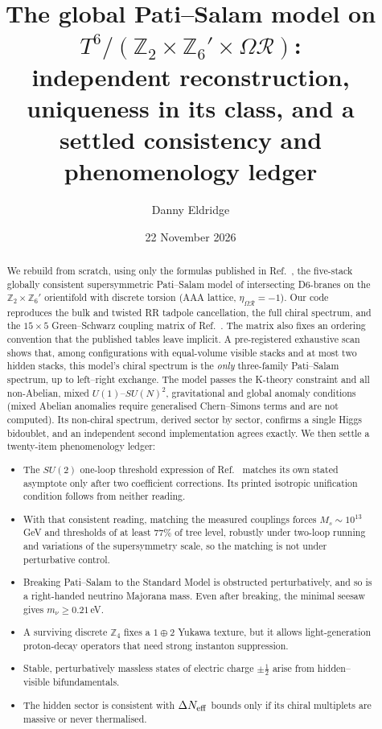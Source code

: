 \documentclass[aps,prd,twocolumn,superscriptaddress,nofootinbib,showkeys]{revtex4-2}
\begin{document}
\title{The global Pati--Salam model on $T^6/(\mathbb{Z}_2\times\mathbb{Z}_6'\times\Omega\mathcal{R})$:\\ independent reconstruction, uniqueness in its class, and a settled consistency and phenomenology ledger}
\author{Danny Eldridge}
\date{22 November 2026}
\begin{abstract}
We rebuild from scratch, using only the formulas published in Ref.~\cite{HRS}, the five-stack globally consistent supersymmetric Pati--Salam model of intersecting D6-branes on the $\mathbb{Z}_2\times\mathbb{Z}_6'$ orientifold with discrete torsion (AAA lattice, $\eta_{\Omega\mathcal R}=-1$). Our code reproduces the bulk and twisted RR tadpole cancellation, the full chiral spectrum, and the $15\times5$ Green--Schwarz coupling matrix of Ref.~\cite{HRS}. The matrix also fixes an ordering convention that the published tables leave implicit. A pre-registered exhaustive scan shows that, among configurations with equal-volume visible stacks and at most two hidden stacks, this model's chiral spectrum is the \emph{only} three-family Pati--Salam spectrum, up to left--right exchange. The model passes the K-theory constraint and all non-Abelian, mixed $U(1)$--$SU(N)^2$, gravitational and global anomaly conditions (mixed Abelian anomalies require generalised Chern--Simons terms and are not computed). Its non-chiral spectrum, derived sector by sector, confirms a single Higgs bidoublet, and an independent second implementation agrees exactly. We then settle a twenty-item phenomenology ledger:
\begin{itemize}
\item The $SU(2)$ one-loop threshold expression of Ref.~\cite{HRS} matches its own stated asymptote only after two coefficient corrections. Its printed isotropic unification condition follows from neither reading.
\item With that consistent reading, matching the measured couplings forces $M_s\sim10^{13}$\,GeV and thresholds of at least $77\%$ of tree level, robustly under two-loop running and variations of the supersymmetry scale, so the matching is not under perturbative control.
\item Breaking Pati--Salam to the Standard Model is obstructed perturbatively, and so is a right-handed neutrino Majorana mass. Even after breaking, the minimal seesaw gives $m_\nu\ge0.21$\,eV.
\item A surviving discrete $\mathbb Z_4$ fixes a $1\oplus2$ Yukawa texture, but it allows light-generation proton-decay operators that need strong instanton suppression.
\item Stable, perturbatively massless states of electric charge $\pm\tfrac12$ arise from hidden--visible bifundamentals.
\item The hidden sector is consistent with $\Delta N_{\rm eff}$ bounds only if its chiral multiplets are massive or never thermalised.
\end{itemize}
\end{abstract}
\end{document}
